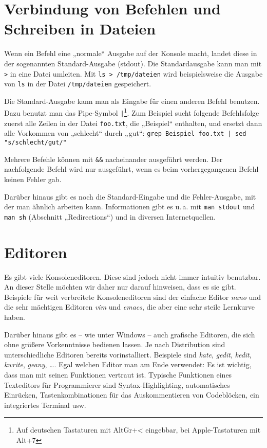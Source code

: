\documentclass[a4paper,12pt]{article}
\begin{document}
\section{Verbindung von Befehlen und Schreiben in Dateien}

Wenn ein Befehl eine „normale“ Ausgabe auf der Konsole macht, landet diese in der sogenannten Standard-Ausgabe (stdout). Die Standardausgabe kann man mit \texttt{>} in eine Datei umleiten. Mit \texttt{ls > /tmp/dateien} wird beispielsweise die Ausgabe von \texttt{ls} in der Datei \texttt{/tmp/dateien} gespeichert.

Die Standard-Ausgabe kann man als Eingabe für einen anderen Befehl benutzen. Dazu benutzt man das Pipe-Symbol \texttt{|}\footnote{Auf deutschen Tastaturen mit AltGr+< eingebbar, bei Apple-Tastaturen mit Alt+7}. Zum Beispiel sucht folgende Befehlsfolge zuerst alle Zeilen in der Datei \texttt{foo.txt}, die „Beispiel“ enthalten, und ersetzt dann alle Vorkommen von „schlecht“ durch „gut“: \texttt{grep Beispiel foo.txt | sed "s/schlecht/gut/"}

Mehrere Befehle können mit \texttt{\&\&} nacheinander ausgeführt werden. Der nachfolgende Befehl wird nur ausgeführt, wenn es beim vorhergegangenen Befehl keinen Fehler gab.

Darüber hinaus gibt es noch die Standard-Eingabe und die Fehler-Ausgabe, mit der man ähnlich arbeiten kann. Informationen gibt es u.\,a. mit \texttt{man stdout} und \texttt{man sh} (Abschnitt „Redirections“) und in diversen Internetquellen.

\section{Editoren}
Es gibt viele Konsoleneditoren. Diese sind jedoch nicht immer intuitiv 
benutzbar. An dieser Stelle möchten wir daher nur darauf hinweisen, dass 
es sie gibt. Beispiele für weit verbreitete Konsoleneditoren sind der einfache Editor
\emph{nano} und die sehr mächtigen Editoren \emph{vim} und \emph{emacs}, die aber eine sehr steile Lernkurve haben.

Darüber hinaus gibt es -- wie unter Windows -- auch grafische Editoren, 
die sich ohne größere Vorkenntnisse bedienen lassen. Je nach Distribution
sind unterschiedliche Editoren bereits vorinstalliert. Beispiele sind
\emph{kate}, \emph{gedit}, \emph{kedit}, \emph{kwrite}, \emph{geany}, \dots. Egal welchen Editor man am Ende verwendet: Es ist wichtig, dass man mit seinen Funktionen vertraut ist. Typische Funktionen eines Texteditors für Programmierer sind Syntax-Highlighting, automatisches Einrücken, Tastenkombinationen für das Auskommentieren von Codeblöcken, ein integriertes Terminal usw.
\end{document}
